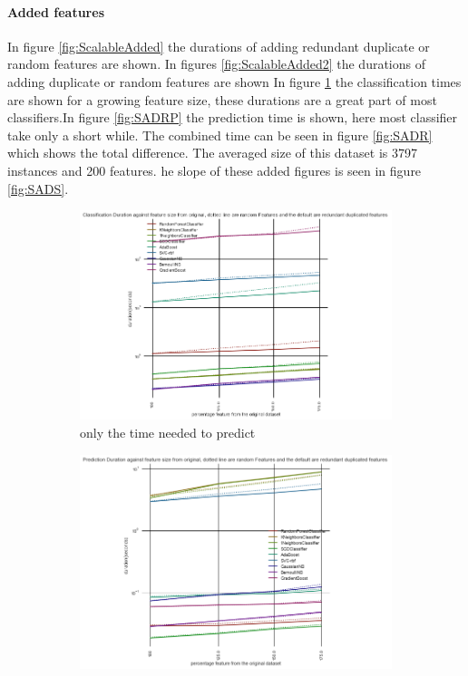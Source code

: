 \documentclass[a4paper,10pt]{article}
\begin{document}
\paragraph{Added features}
In figure \ref{fig:ScalableAdded} the durations of adding redundant duplicate or random features are shown. In figures \ref{fig:ScalableAdded2} the durations of adding duplicate or random features are shown In figure \ref{fig:SADRC} the classification times are shown for a growing feature size, these durations are a great part of most classifiers.In figure \ref{fig:SADRP} the prediction time is shown, here most classifier take only a short while. The combined time can be seen in figure \ref{fig:SADR} which shows the total difference.
The averaged size of this dataset is 3797 instances and 200 features. he slope of these added figures is seen in figure \ref{fig:SADS}.
\begin{figure}[H]
	\centering	
	\begin{subfigure}[b]{0.45\textwidth}
		\includegraphics[width=\textwidth]{images/scalability/FeatAddDupRandClass.png}
		\caption{only the time needed to predict }
		\label{fig:SADRC}
	\end{subfigure}
	\begin{subfigure}[b]{0.45\textwidth}
		\includegraphics[width=\textwidth]{images/scalability/FeatAddDupRandPred.png}

\end{subfigure}
\end{figure}
\end{document}
